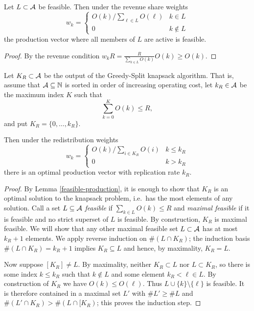 \begin{lemma}
\label{feasible-production}

  Let $L\subset\mathcal{A}$ be feasible.
  Then under the revenue share weights
  \[
    w_k = \left\{ \begin{array}{ll}
      O(k)/\sum_{\ell\in L}O(\ell) & k\in L \\
      0 & k \not\in L
    \end{array} \right.
  \]
  the production vector where all members of $L$ are active is feasible.

\end{lemma}
%
\begin{proof}

  By the revenue condition $w_kR = \frac{R}{\sum_{k\in L}O(k)}O(k) \geq O(k)$. \qedhere

\end{proof}

\begin{proposition}\label{thm:optimal-production-vector}

  Let $K_R\subset\mathcal{A}$ be the output of the Greedy-Split knapsack algorithm.
  That is, assume that $\mathcal{A}\subseteq\mathbb{N}$ is sorted in order of increasing operating cost, let $k_R\in\mathcal{A}$ be the maximum index $K$ such that
  \[
    \sum_{k=0}^KO(k) \leq R,
  \]
  and put $K_R=\{0,\ldots,k_R\}$.

  Then under the redistribution weights
  \[
    w_k = \left\{ \begin{array}{ll}
      O(k)/\sum_{i\in K_R}O(i) & k\leq k_R \\
      0 & k > k_R
    \end{array} \right.
  \]
  there is an optimal production vector with replication rate $k_R$.

\end{proposition}
%
\begin{proof}

  By Lemma \ref{feasible-production}, it is enough to show that $K_R$ is an optimal solution to the knapsack problem, i.e.~has the most elements of any solution.
  Call a set $L\subseteq\mathcal{A}$ \emph{feasible} if $\sum_{k\in L}O(k)\leq R$ and \emph{maximal feasible} if it is feasible and no strict superset of $L$ is feasible.
  By construction, $K_R$ is maximal feasible.
  We will show that any other maximal feasible set $L\subset\mathcal{A}$ has at most $k_R+1$ elements. 
  We apply reverse induction on $\#(L\cap K_R)$; the induction basis $\#(L\cap K_R) = k_R+1$ implies $K_R\subseteq L$ and hence, by maximality, $K_R=L$. 
  
  Now suppose $[K_R]\neq L$.
  By maximality, neither $K_R\subset L$ nor $L\subset K_R$, so there is some index $k\leq k_R$ such that $k\not\in L$ and some element $k_R<\ell\in L$.
  By construction of $K_R$ we have $O(k)\leq O(\ell)$.
  Thus $L\cup\{k\}\setminus\{\ell\}$ is feasible.
  It is therefore contained in a maximal set $L'$ with $\#L'\geq\#L$ and $\#(L'\cap K_R) > \#(L\cap[ K_R)$; this proves the induction step. 
  \qedhere


\end{proof}

